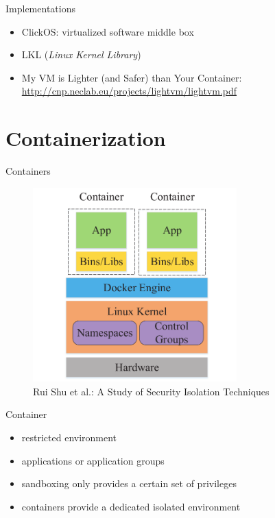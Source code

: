 \documentclass{curs}
\begin{document}
\begin{frame}{Implementations}
  \begin{itemize}
    \item ClickOS: virtualized software middle box
    \item LKL (\textit{Linux Kernel Library})
    \item My VM is Lighter (and Safer) than Your Container: \url{http://cnp.neclab.eu/projects/lightvm/lightvm.pdf}
  \end{itemize}
\end{frame}

\section{Containerization}

\begin{frame}{Containers}
  \begin{figure}
    \centering
    \includegraphics[width=0.7\textwidth]{img/container} \\
    {\tiny Rui Shu et al.: A Study of Security Isolation Techniques}
  \end{figure}
\end{frame}

\begin{frame}{Container}
  \begin{itemize}
    \item restricted environment
    \item applications or application groups
    \item sandboxing only provides a certain set of privileges
    \item containers provide a dedicated isolated environment
  \end{itemize}
\end{frame}
\end{document}
